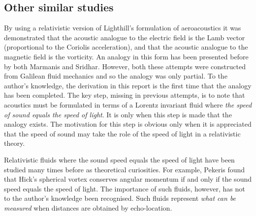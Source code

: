 \documentclass[10pt, fleqn,final,showtrims,oldfontcommands, article,a4paper,oneside]{memoir} %
\begin{document}
\subsection{Other similar studies}

By using a relativistic version of Lighthill's formulation of aeroacoustics it was demonstrated 
that the acoustic analogue to the electric field is the Lamb vector (proportional to the Coriolis acceleration),
and that the acoustic analogue to the magnetic field is the vorticity.
An analogy in this form has been presented before by both Marmanis\cite{Marmanis2000} and Sridhar\cite{Marmanis2000,Sridhar1998}.
However, both these attempts were constructed from Galilean fluid mechanics and so the analogy was only partial.
To the author's knowledge, the derivation in this report is the first time that the analogy has been  completed.
The key step, missing in previous attempts, 
is to note that acoustics must be formulated in terms of a Lorentz invariant fluid where
{\em the speed of sound equals the speed of light}.
It is only when this step is made that the analogy exists.
The motivation for this step is obvious only when it is appreciated that the speed of sound
may take the role of the speed of light in a relativistic theory.



Relativistic fluids where the sound speed equals the speed of light have been studied many times before
as theoretical curiosities\cite{Taub1978,Pekeris1976, Pekeris1977}.
For example, Pekeris found that Hick's spherical vortex conserves angular momentum if and only if
the sound speed equals the speed of light\cite{Pekeris1977}.
The importance of such fluids, however, has not to the author's knowledge been recognised.
Such fluids represent {\em what can be measured} when distances are obtained by echo-location.
\end{document}
